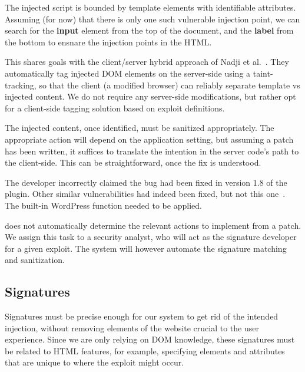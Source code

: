 The injected script is bounded by template elements with identifiable
attributes. Assuming (for now) that there is only one such vulnerable
injection point, we can search for the \textbf{input} element from the
top of the document, and the \textbf{label} from the bottom to ensnare
the injection points in the HTML.

This shares goals with the client/server hybrid approach of Nadji et
al.~\cite{Nadji:2009}. They automatically tag injected DOM elements on the
server-side using a taint-tracking, so that the client (a
modified browser) can reliably separate template vs
injected content. We do not require any server-side modifications, but rather opt for a client-side tagging solution based on exploit definitions.

The injected content, once identified, must be sanitized appropriately.
The appropriate action will depend on the application setting, but
assuming a patch has been written, it suffices to translate the
intention in the server code's path to the client-side.
This can be straightforward, once the fix is understood.

The developer incorrectly claimed the bug had
been fixed in version 1.8 of the plugin.
Other similar vulnerabilities had indeed been fixed, but not this one~\cite{rccpatch}. The built-in WordPress function  needed to be applied.

\xss does not automatically determine the relevant actions to
implement from a patch. We assign this task to a security
analyst, who will act as the signature developer for a given
exploit. The system will however automate the signature matching and
sanitization.


\subsection{\sys Signatures} \label{signatures}


Signatures must be precise enough for our system to get rid of the
intended injection, without removing elements of the website crucial
to the user experience. Since we are only relying on DOM knowledge,
these signatures must be related to HTML features, for example,
specifying elements and attributes that are unique to where the
exploit might occur.

